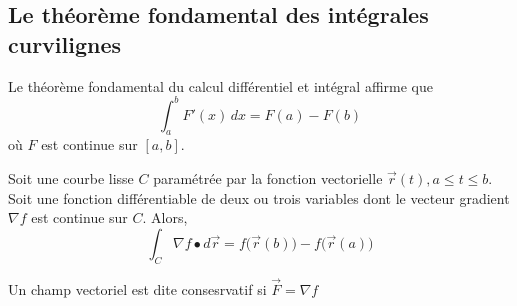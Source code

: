 	\subsection{Le théorème fondamental des intégrales curvilignes}
		\begin{mythm}
			Le théorème  fondamental du calcul différentiel et intégral affirme que \[\int_{a}^{b}F'(x)\, dx=F(a)-F(b)\] où $F$ est continue sur $[a,b]$.
		\end{mythm}
		\begin{mythm}
			Soit une courbe lisse $C$ paramétrée par la fonction vectorielle $\vec{r}(t), a\leq t\leq b$. Soit une fonction différentiable de deux ou trois variables dont le vecteur gradient $\nabla f$ est continue sur $C$. Alors,\[\int_C \nabla f\bullet d\vec{r}=f\big(\vec{r}(b)\big)-f\big(\vec{r}(a)\big)\]
		\end{mythm}
		\begin{mydef}
			Un champ vectoriel est dite consesrvatif si $\vec{F}=\nabla f$
		\end{mydef}
